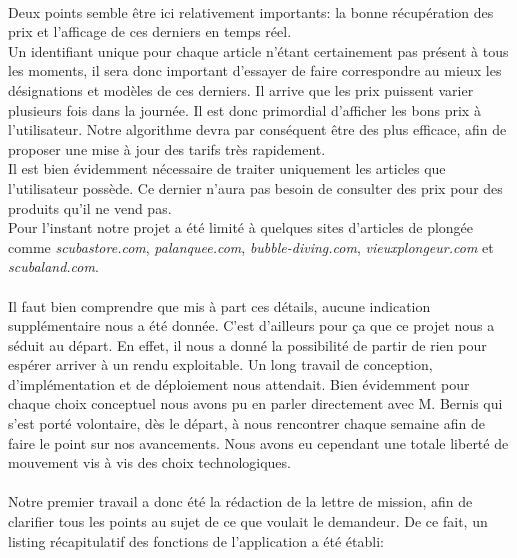 \documentclass{report}
\begin{document}
\paragraph{}

Deux points semble être ici relativement importants: la bonne récupération des prix et l'afficage de ces derniers en temps réel. 
\\Un identifiant unique pour chaque article n'étant certainement pas présent à tous les moments, il sera donc important d'essayer de faire correspondre au mieux les désignations et modèles de ces derniers. Il arrive que les prix puissent varier plusieurs fois dans la journée. Il est donc primordial d'afficher les bons prix à l'utilisateur. Notre algorithme devra par conséquent être des plus efficace, afin de proposer une mise à jour des tarifs très rapidement.\\
Il est bien évidemment nécessaire de traiter uniquement les articles que l'utilisateur possède. Ce dernier n'aura pas besoin de consulter des prix pour des produits qu'il ne vend pas.
\\
Pour l'instant notre projet a été limité à quelques sites d'articles de plongée comme \textit{scubastore.com}, \textit{palanquee.com}, \textit{bubble-diving.com}, \textit{vieuxplongeur.com} et \textit{scubaland.com}.   

\paragraph{}

Il faut bien comprendre que mis à part ces détails, aucune indication supplémentaire nous a été donnée. C'est d'ailleurs pour ça que ce projet nous a séduit au départ. En effet, il nous a donné la possibilité de partir de rien pour espérer arriver à un rendu exploitable. Un long travail de conception, d'implémentation et de déploiement nous attendait. Bien évidemment pour chaque choix conceptuel nous avons pu en parler directement avec M. Bernis qui s'est porté volontaire, dès le départ, à nous rencontrer chaque semaine afin de faire le point sur nos avancements. Nous avons eu cependant une totale liberté de mouvement vis à vis des choix technologiques.

\paragraph{}
Notre premier travail a donc été la rédaction de la lettre de mission, afin de clarifier tous les points au sujet de ce que voulait le demandeur.
De ce fait, un listing récapitulatif des fonctions de l'application a été établi:
\end{document}
